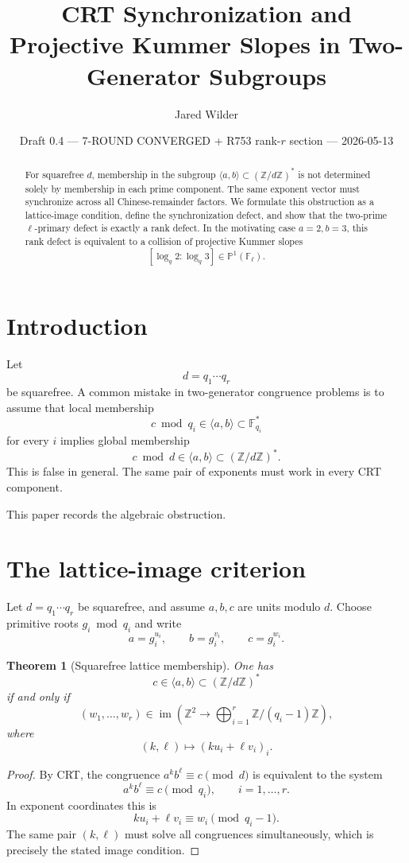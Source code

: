 \documentclass[11pt]{article}
\title{CRT Synchronization and Projective Kummer Slopes in Two-Generator Subgroups}
\author{Jared Wilder}
\date{Draft 0.4 --- 7-ROUND CONVERGED + R753 rank-$r$ section --- 2026-05-13}
\newtheorem{theorem}{Theorem}
\newcommand{\Z}{\mathbb Z}
\newcommand{\F}{\mathbb F}
\newcommand{\1}{\mathbf 1}
\newcommand{\im}{\operatorname{im}}
\begin{document}
\maketitle

\begin{abstract}
For squarefree \(d\), membership in the subgroup \(\langle a,b\rangle\subset(\Z/d\Z)^*\) is not determined solely by membership in each prime component.  The same exponent vector must synchronize across all Chinese-remainder factors.  We formulate this obstruction as a lattice-image condition, define the synchronization defect, and show that the two-prime \(\ell\)-primary defect is exactly a rank defect.  In the motivating case \(a=2,b=3\), this rank defect is equivalent to a collision of projective Kummer slopes
\[
[\log_q2:\log_q3]\in\mathbb P^1(\F_\ell).
\]
\end{abstract}

\section{Introduction}

Let
\[
d=q_1\cdots q_r
\]
be squarefree.  A common mistake in two-generator congruence problems is to assume that local membership
\[
c\bmod q_i\in\langle a,b\rangle\subset\F_{q_i}^*
\]
for every \(i\) implies global membership
\[
c\bmod d\in\langle a,b\rangle\subset(\Z/d\Z)^*.
\]
This is false in general.  The same pair of exponents must work in every CRT component.

This paper records the algebraic obstruction.

\section{The lattice-image criterion}

Let \(d=q_1\cdots q_r\) be squarefree, and assume \(a,b,c\) are units modulo \(d\).  Choose primitive roots \(g_i\bmod q_i\) and write
\[
a=g_i^{u_i},\qquad b=g_i^{v_i},\qquad c=g_i^{w_i}.
\]

\begin{theorem}[Squarefree lattice membership]\label{T:lattice}
One has
\[
c\in\langle a,b\rangle\subset(\Z/d\Z)^*
\]
if and only if
\[
(w_1,\dots,w_r)\in
\im\left(
\Z^2\to\bigoplus_{i=1}^r\Z/(q_i-1)\Z
\right),
\]
where
\[
(k,\ell)\mapsto(ku_i+\ell v_i)_i.
\]
\end{theorem}

\begin{proof}
By CRT, the congruence \(a^k b^\ell\equiv c\pmod d\) is equivalent to the system
\[
a^k b^\ell\equiv c\pmod {q_i},\qquad i=1,\dots,r.
\]
In exponent coordinates this is
\[
ku_i+\ell v_i\equiv w_i\pmod {q_i-1}.
\]
The same pair \((k,\ell)\) must solve all congruences simultaneously, which is precisely the stated image condition.
\end{proof}
\end{document}
